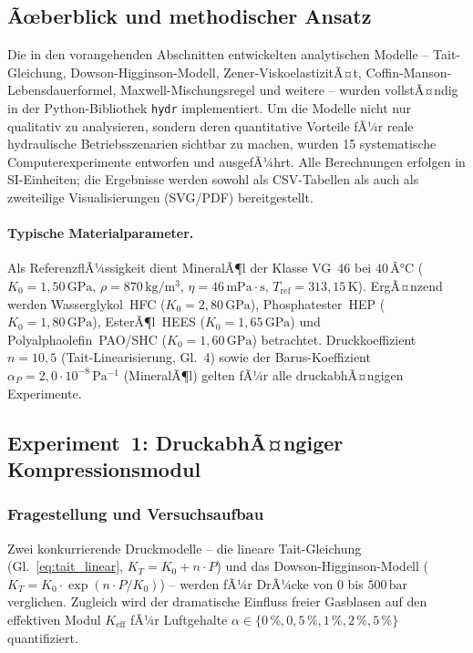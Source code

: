 ﻿\documentclass[a4paper,12pt]{scrreprt}
\theoremstyle{definition}
\begin{document}
\subsection{Ãœberblick und methodischer Ansatz}
\label{sec:exp_ueberblick}

Die in den vorangehenden Abschnitten entwickelten analytischen Modelle --
Tait-Gleichung, Dowson-Higginson-Modell, Zener-ViskoelastizitÃ¤t, Coffin-Manson-
Lebensdauerformel, Maxwell-Mischungsregel und weitere -- wurden vollstÃ¤ndig in
der Python-Bibliothek \texttt{hydr} implementiert.
Um die Modelle nicht nur qualitativ zu analysieren, sondern deren quantitative
Vorteile fÃ¼r reale hydraulische Betriebsszenarien sichtbar zu machen, wurden
15 systematische Computerexperimente entworfen und ausgefÃ¼hrt.
Alle Berechnungen erfolgen in SI-Einheiten; die Ergebnisse werden sowohl
als CSV-Tabellen als auch als zweiteilige Visualisierungen (SVG/PDF)
bereitgestellt.

\paragraph{Typische Materialparameter.}
Als ReferenzflÃ¼ssigkeit dient MineralÃ¶l der Klasse VG~46 bei $40\,Â°\mathrm{C}$
($K_0 = 1{,}50\,\mathrm{GPa}$, $\rho = 870\,\mathrm{kg/m^3}$,
$\eta = 46\,\mathrm{mPa\cdot s}$, $T_{\mathrm{ref}} = 313{,}15\,\mathrm{K}$).
ErgÃ¤nzend werden Wasserglykol~HFC ($K_0 = 2{,}80\,\mathrm{GPa}$),
Phosphatester~HEP ($K_0 = 1{,}80\,\mathrm{GPa}$), EsterÃ¶l~HEES
($K_0 = 1{,}65\,\mathrm{GPa}$) und Polyalphaolefin~PAO/SHC
($K_0 = 1{,}60\,\mathrm{GPa}$) betrachtet.
Druckkoeffizient $n = 10{,}5$ (Tait-Linearisierung, Gl.~4) sowie der
Barus-Koeffizient $\alpha_P = 2{,}0 \cdot 10^{-8}\,\mathrm{Pa^{-1}}$
(MineralÃ¶l) gelten fÃ¼r alle druckabhÃ¤ngigen Experimente.

\subsection{Experiment~1: DruckabhÃ¤ngiger Kompressionsmodul}
\label{sec:exp01}

\subsubsection*{Fragestellung und Versuchsaufbau}

Zwei konkurrierende Druckmodelle -- die lineare Tait-Gleichung
(Gl.~\ref{eq:tait_linear}, $K_T = K_0 + n\cdot P$) und das
Dowson-Higginson-Modell ($K_T = K_0 \cdot \exp(n\cdot P / K_0)$) -- werden
fÃ¼r DrÃ¼cke von $0$ bis $500\,\mathrm{bar}$ verglichen.
Zugleich wird der dramatische Einfluss freier Gasblasen auf den effektiven
Modul $K_{\mathrm{eff}}$ fÃ¼r Luftgehalte
$\alpha \in \{0\,\%, 0{,}5\,\%, 1\,\%, 2\,\%, 5\,\%\}$ quantifiziert.
\end{document}
